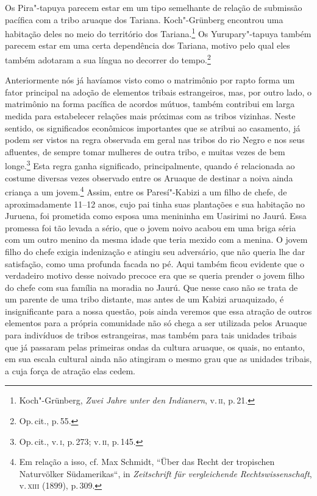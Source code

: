 Os Pira"-tapuya parecem estar em um tipo semelhante de relação de
submissão pacífica com a tribo aruaque dos Tariana. Koch"-Grünberg
encontrou uma habitação deles no meio do território dos
Tariana.\footnote{Koch"-Grünberg, \textit{Zwei Jahre unter den Indianern},
  v.\,\textsc{ii}, p.\,21.} Os Yurupary"-tapuya também parecem estar em uma certa
dependência dos Tariana, motivo pelo qual eles também adotaram a sua
língua no decorrer do tempo.\footnote{Op.\,cit., p.\,55.}

Anteriormente nós já havíamos visto como o matrimônio por rapto forma um
fator principal na adoção de elementos tribais estrangeiros, mas, por
outro lado, o matrimônio na forma pacífica de acordos mútuos, também
contribui em larga medida para estabelecer relações mais próximas com as
tribos vizinhas. Neste sentido, os significados econômicos importantes
que se atribui ao casamento, já podem ser vistos na regra observada em
geral nas tribos do rio Negro e nos seus afluentes, de sempre tomar
mulheres de outra tribo, e muitas vezes de bem longe.\footnote{Op.\,cit.,
  v.\,\textsc{i}, p.\,273; v.\,\textsc{ii}, p.\,145.} Esta regra ganha significado,
principalmente, quando é relacionada ao costume diversas vezes observado
entre os Aruaque de destinar a noiva ainda criança a um jovem.\footnote{Em
  relação a isso, cf. Max Schmidt, ``Über das Recht der tropischen
  Naturvölker Südamerikas``, in \textit{Zeitschrift für vergleichende
  Rechtswissenschaft}, v.\,\textsc{xiii} (1899), p.\,309.} Assim, entre os
Paresí"-Kabizi a um filho de chefe, de aproximadamente 11--12 anos, cujo
pai tinha suas plantações e sua habitação no Juruena, foi prometida
como esposa uma menininha em Uasirimi no Jaurú. Essa promessa foi tão
levada a sério, que o jovem noivo acabou em uma briga séria com um outro
menino da mesma idade que teria mexido com a menina. O jovem filho do
chefe exigia indenização e atingiu seu adversário, que não queria lhe
dar satisfação, como uma profunda facada no pé. Aqui também ficou
evidente que o verdadeiro motivo desse noivado precoce era que se queria
prender o jovem filho do chefe com sua família na moradia no Jaurú. Que
nesse caso não se trata de um parente de uma tribo distante, mas antes
de um Kabizi aruaquizado, é insignificante para a nossa questão, pois
ainda veremos que essa atração de outros elementos para a própria
comunidade não só chega a ser utilizada pelos Aruaque para indivíduos de
tribos estrangeiras, mas também para tais unidades tribais que já
passaram pelas primeiras ondas da cultura aruaque, os quais, no
entanto, em sua escala cultural ainda não atingiram o mesmo grau que as
unidades tribais, a cuja força de atração elas cedem.

